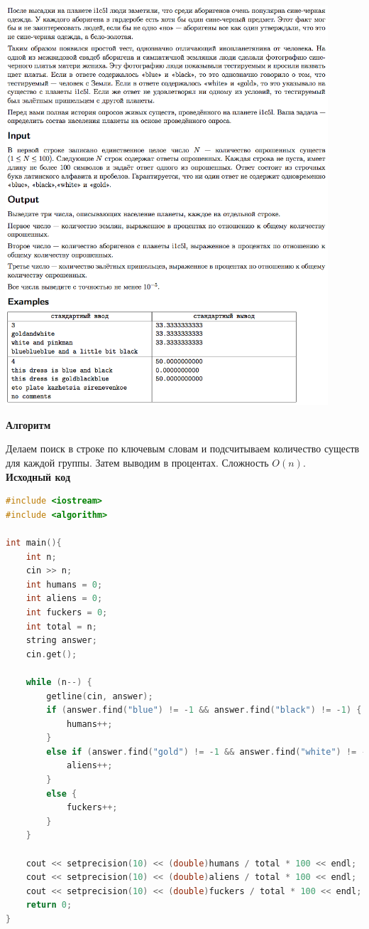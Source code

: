 \documentclass[a4paper,12pt]{article}
\begin{document}
\begin{center}
\includegraphics[width=0.9\textwidth]{OC_Tatarstan/OC_Tatarstan_M.png}\\ [1cm]
\end{center}

\newpage
\textbf{{\large Алгоритм}}

Делаем поиск в строке по ключевым словам и подсчитываем количество существ для  каждой группы. Затем выводим в процентах. Сложность $O(n)$. \\

\textbf{{\large Исходный код}} \\
\begin{lstlisting}[language=C++]
#include <iostream>
#include <algorithm>

int main(){
    int n;
    cin >> n;
    int humans = 0;
    int aliens = 0;
    int fuckers = 0;
    int total = n;
    string answer;
    cin.get();

    while (n--) {
        getline(cin, answer);
        if (answer.find("blue") != -1 && answer.find("black") != -1) {
            humans++;
        }
        else if (answer.find("gold") != -1 && answer.find("white") != -1) {
            aliens++;
        }
        else {
            fuckers++;
        }
    }

    cout << setprecision(10) << (double)humans / total * 100 << endl;
    cout << setprecision(10) << (double)aliens / total * 100 << endl;
    cout << setprecision(10) << (double)fuckers / total * 100 << endl;
    return 0;
}
\end{lstlisting}
\end{document}
